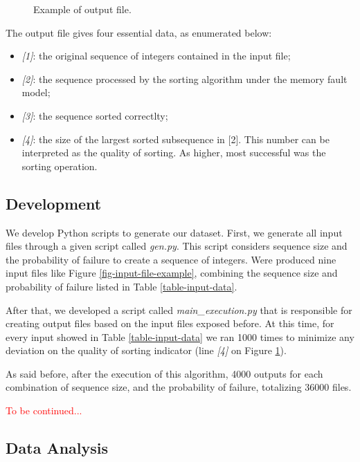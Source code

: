 \begin{figure}[H]
    \centering
    \fbox{
    \theverbbox
    }
    \caption{Example of output file.}
    \label{fig-output-file-example}
\end{figure}

The output file gives four essential data, as enumerated below:
\begin{itemize}
    \item \textit{[1]}: the original sequence of integers contained in the input file;
    \item \textit{[2]}: the sequence processed by the sorting algorithm under the memory fault model;
    \item \textit{[3]}: the sequence sorted correctlty;
    \item \textit{[4]}: the size of the largest sorted subsequence in [2]. This number can be interpreted as the quality of sorting. As higher, most successful was the sorting operation.
\end{itemize}

\subsection{Development}

We develop Python scripts to generate our dataset. First, we generate all input files through a given script called \textit{gen.py}. This script considers sequence size and the probability of failure to create a sequence of integers. Were produced nine input files like Figure \ref{fig-input-file-example}, combining the sequence size and probability of failure listed in Table \ref{table-input-data}.

After that, we developed a script called \textit{main\_execution.py} that is responsible for creating output files based on the input files exposed before. At this time, for every input showed in Table \ref{table-input-data} we ran 1000 times to minimize any deviation on the quality of sorting indicator (line \textit{[4]} on Figure \ref{fig-output-file-example}).

As said before, after the execution of this algorithm, 4000 outputs for each combination of sequence size, and the probability of failure, totalizing 36000 files.

\textcolor{red}{To be continued...}

\subsection{Data Analysis}

